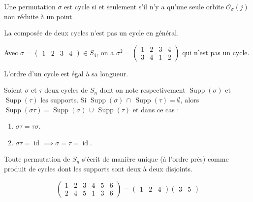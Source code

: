 
  \begin{proposition}
    Une permutation $\sigma$ est cycle si et seulement s'il n'y a qu'une seule orbite $\mathcal{O}_\sigma(j)$ non réduite à un point.
  \end{proposition}

  \begin{remark}
    La composée de deux cycles n'est pas un cycle en général.
  \end{remark}

  \begin{example}
    Avec $\sigma = \begin{pmatrix} 1 & 2 & 3 & 4 \end{pmatrix} \in S_4$, on a $\sigma^2 = \begin{pmatrix} 1 & 2 & 3 & 4 \\ 3 & 4 & 1 & 2 \end{pmatrix}$ qui n'est pas un cycle.
  \end{example}

  \begin{proposition}
    L'ordre d'un cycle est égal à sa longueur.
  \end{proposition}


  \begin{proposition}
    Soient $\sigma$ et $\tau$ deux cycles de $S_n$ dont on note respectivement $\operatorname{Supp}(\sigma)$ et $\operatorname{Supp}(\tau)$ les supports. Si $\operatorname{Supp}(\sigma) \, \cap \, \operatorname{Supp}(\tau) = \emptyset$, alors $\operatorname{Supp}(\sigma\tau) = \operatorname{Supp}(\sigma) \, \cup \, \operatorname{Supp}(\tau)$ et dans ce cas :
    \begin{enumerate}[label=(\roman*)]
      \item $\sigma\tau = \tau\sigma$.
      \item $\sigma\tau = \operatorname{id} \implies \sigma = \tau = \operatorname{id}$.
    \end{enumerate}
  \end{proposition}

  \begin{theorem}
    Toute permutation de $S_n$ s'écrit de manière unique (à l'ordre près) comme produit de cycles dont les supports sont deux à deux disjoints.
  \end{theorem}

  \begin{example}
    \label{105-1}
    \[
    \begin{pmatrix}
      1 & 2 & 3 & 4 & 5 & 6 \\
      2 & 4 & 5 & 1 & 3 & 6
    \end{pmatrix}
    =
    \begin{pmatrix} 1 & 2 & 4 \end{pmatrix}\begin{pmatrix} 3 & 5 \end{pmatrix}
    \]
  \end{example}

